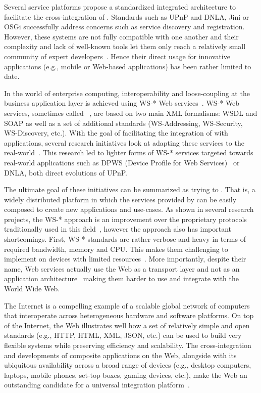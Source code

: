Several service platforms propose a standardized integrated architecture to facilitate the cross-integration of \sts{}. Standards such as UPnP and DNLA, Jini or OSGi successfully address concerns such as service discovery and registration. However, these systems are not fully compatible with one another and their complexity and lack of well-known tools let them only reach a relatively small community of expert developers~\cite{DeDeugd2006}. Hence their direct usage for innovative applications (e.g., mobile or Web-based applications) has been rather limited to date.
 
In the world of enterprise computing, interoperability and loose-coupling at the business application layer is achieved using WS-* Web services~\cite{Alonso2010}. WS-* Web services, sometimes called ~\cite{Pautasso2008}, are based on two main XML formalisms: WSDL and SOAP as well as a set of additional standards (WS-Addressing, WS-Security, WS-Discovery, etc.). With the goal of facilitating the integration of \sts{} with applications, several research initiatives look at adapting these services to the real-world~\cite{Priyantha2008,DeSouza2008,Jammes2005,Guinard2009-INSS,Riedel2010}. This research led to lighter forms of WS-* services targeted towards real-world applications such as DPWS (Device Profile for Web Services)~\cite{Jammes2005} or DNLA, both direct evolutions of UPnP.

The ultimate goal of these initiatives can be summarized as trying to . That is, a widely distributed platform in which the services provided by \sts{} can be easily composed to create new applications and use-cases. As shown in several research projects, the WS-* approach is an improvement over the proprietary protocols traditionally used in this field~\cite{DeSouza2008,Jammes2005,DeDeugd2006}, however the approach also has important shortcomings. First, WS-* standards are rather verbose and heavy in terms of required bandwidth, memory and CPU. This makes them challenging to implement on devices with limited resources~\cite{Yazar2009,Pautasso2008}. More importantly, despite their name, Web services actually use the Web as a transport layer and not as an application architecture~\cite{Pautasso2009} making them harder to use and integrate with the World Wide Web.

The Internet is a compelling example of a scalable global network of computers that interoperate across heterogeneous hardware and software platforms. On top of the Internet, the Web illustrates well how a set of relatively simple and open standards (e.g., HTTP, HTML, XML, JSON, etc.) can be used to build very flexible systems while preserving efficiency and scalability. The cross-integration and developments of composite applications on the Web, alongside with its ubiquitous availability across a broad range of devices (e.g., desktop computers, laptops, mobile phones, set-top boxes, gaming devices, etc.), make the Web an outstanding candidate for a universal integration platform~\cite{Guinard2010-WoT}.

